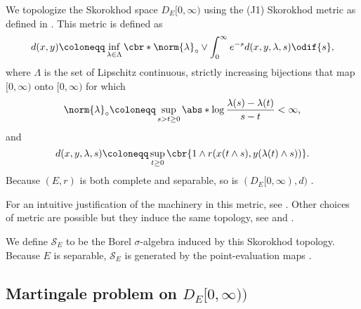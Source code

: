 We topologize the Skorokhod space $D_E[0,\infty)$ using the (J1) Skorokhod metric as defined in \cite[pp.116-117]{ethierMarkovProcessesCharacterization1985}.
This metric is defined as
\begin{equation}
  d(x,y) \coloneqq \inf_{\lambda \in \Lambda} \cbr*{ \norm{\lambda}_\circ \lor \int_0^\infty e^{-s} d(x,y,\lambda,s) \odif{s} },
\end{equation}
where $\Lambda$ is the set of Lipschitz continuous, strictly increasing bijections that map $[0,\infty)$ onto $[0,\infty)$ for which
\begin{equation}
  \norm{\lambda}_\circ \coloneqq \sup_{s > t \geq 0} \abs*{ \log \frac{\lambda(s)-\lambda(t)}{s-t} } < \infty,
\end{equation}
and
\begin{equation}
  d(x,y,\lambda,s) \coloneqq \sup_{t \geq 0} \cbr{ 1 \land r(x(t \land s), y(\lambda(t) \land s)) }.
\end{equation}
Because $(E, r)$ is both complete and separable, so is $(D_E[0,\infty), d)$ \cite[Theorem 3.5.6]{ethierMarkovProcessesCharacterization1985}.

For an intuitive justification of the machinery in this metric, see \cite{kernSkorokhodTopologiesWhat2024}.
Other choices of metric are possible but they induce the same topology, see \cite[pp.166-168]{billingsleyConvergenceProbabilityMeasures1999} and \cite[p.122-123]{pollardConvergenceStochasticProcesses1984}.

\medskip

We define $\mathscr{S}_{E}$ to be the Borel $\sigma$-algebra induced by this Skorokhod topology.
Because $E$ is separable, $\mathscr{S}_{E}$ is generated by the point-evaluation maps \cite[Proposition 3.7.1]{ethierMarkovProcessesCharacterization1985}.


\subsection{Martingale problem on \texorpdfstring{$D_E[0,\infty))$}{D_E[0,infinity)}}\label{sec:martingale-problem}

